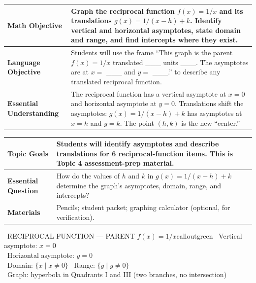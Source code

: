 \documentclass[11pt]{article}
\begin{document}

{\small
\renewcommand{\arraystretch}{1.25}
\noindent\begin{tabular}{|p{1.8in}|p{4.8in}|}
\hline
\textbf{Math Objective} & Graph the reciprocal function \(f(x) = 1/x\) and its translations \(g(x) = 1/(x-h) + k\). Identify vertical and horizontal asymptotes, state domain and range, and find intercepts where they exist. \\ \hline
\textbf{Language Objective} & Students will use the frame ``This graph is the parent \(f(x) = 1/x\) translated \_\_\_ units \_\_\_. The asymptotes are at \(x =\) \_\_\_ and \(y =\) \_\_\_.'' to describe any translated reciprocal function. \\ \hline
\textbf{Essential Understanding} & The reciprocal function has a vertical asymptote at \(x = 0\) and horizontal asymptote at \(y = 0\). Translations shift the asymptotes: \(g(x) = 1/(x-h) + k\) has asymptotes at \(x = h\) and \(y = k\). The point \((h, k)\) is the new ``center.'' \\ \hline
\end{tabular}
}

{\small
\renewcommand{\arraystretch}{1.25}
\noindent\begin{tabular}{|p{1.8in}|p{4.8in}|}
\hline
\textbf{Topic Goals} & Students will identify asymptotes and describe translations for 6 reciprocal-function items. This is Topic 4 assessment-prep material. \\ \hline
\textbf{Essential Question} & How do the values of \(h\) and \(k\) in \(g(x) = 1/(x-h) + k\) determine the graph's asymptotes, domain, range, and intercepts? \\ \hline
\textbf{Materials} & Pencils; student packet; graphing calculator (optional, for verification). \\ \hline
\end{tabular}
}


\begin{callout}{\IconBook\ RECIPROCAL FUNCTION --- PARENT \(f(x) = 1/x\)}{calloutgreen}
\textbullet\ Vertical asymptote: \(x = 0\)\\
\textbullet\ Horizontal asymptote: \(y = 0\)\\
\textbullet\ Domain: \(\{x \mid x \neq 0\}\) \hspace{1.8em} \textbullet\ Range: \(\{y \mid y \neq 0\}\)\\
\textbullet\ Graph: hyperbola in Quadrants I and III (two branches, no intersection)
\end{callout}
\end{document}
